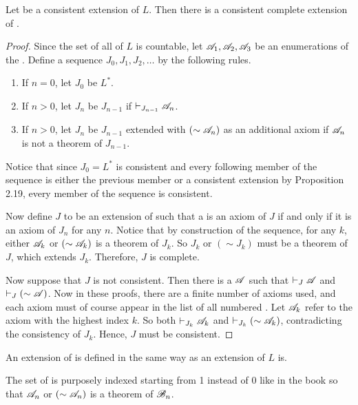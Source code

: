 \begin{proposition}
  Let \Lext{} be a consistent extension of \(L\). Then there is a consistent complete extension of \Lext{}.

  \begin{proof}
    Since the set of all \wfs{} of \(L\) is countable, let \(\mathscr{A}_1, \mathscr{A}_2, \mathscr{A}_3\) be an enumerations of the \wfs{}. Define a sequence \(J_0, J_1, J_2, \dots\) by the following rules.

    \begin{enumerate}
      \item If \(n = 0\), let \(J_0\) be \(L^{\ast}\).

      \item If \(n > 0\), let \(J_n\) be \(J_{n - 1}\) if \(\vdash_{J_{n - 1}} \mathscr{A}_n\).

      \item If \(n > 0\), let \(J_n\) be \(J_{n - 1}\) extended with \((\sim\mathscr{A}_n)\) as an additional axiom if \(\mathscr{A}_n\) is not a theorem of \(J_{n - 1}\).
    \end{enumerate}

    Notice that since \(J_0 = L^{\ast}\) is consistent and every following member of the sequence is either the previous member or a consistent extension by Proposition 2.19, every member of the sequence is consistent.

    Now define \(J\) to be an extension of \Lext{} such that a \wf{} is an axiom of \(J\) if and only if it is an axiom of \(J_n\) for any \(n\). Notice that by construction of the sequence, for any \(k\), either \(\mathscr{A}_k\) or \((\sim\mathscr{A}_k)\) is a theorem of \(J_k\). So \(J_k\) or \((\sim J_k)\) must be a theorem of \(J\), which extends \(J_k\). Therefore, \(J\) is complete.

    Now suppose that \(J\) is not consistent. Then there is a \wf{} \(\mathscr{A}\) such that \(\vdash_{J} \mathscr{A}\) and \(\vdash_{J} (\sim\mathscr{A})\). Now in these proofs, there are a finite number of axioms used, and each axiom must of course appear in the list of all numbered \wfs{}. Let \(\mathscr{A}_k\) refer to the axiom with the highest index \(k\). So both \(\vdash_{J_k} \mathscr{A}_k\) and \(\vdash_{J_k} (\sim\mathscr{A}_k)\), contradicting the consistency of \(J_k\). Hence, \(J\) must be consistent.
  \end{proof}

  \note{} An extension of \Lext{} is defined in the same way as an extension of \(L\) is.

  \note{} The set of \wfs{} is purposely indexed starting from 1 instead of 0 like in the book so that \(\mathscr{A}_n\) or \((\sim\mathscr{A}_n)\) is a theorem of \(\mathscr{B}_n\).
\end{proposition}

